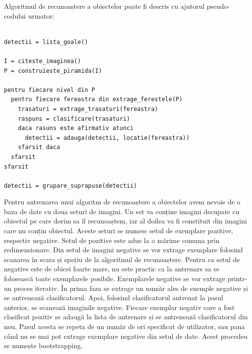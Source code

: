 Algoritmul de recunoaștere a obiectelor poate fi descris cu ajutorul pseudo-codului urmator:
\begin{mdframed}
\begin{verbatim}

detectii = lista_goale()

I = citeste_imaginea()
P = construieste_piramida(I)

pentru fiecare nivel din P
  pentru fiecare fereastra din extrage_ferestele(P)
    trasaturi = extrage_trasaturi(fereastra)
    raspuns = clasificare(trasaturi)
    daca rasuns este afirmativ atunci
      detectii = adauga(detectii, locatie(fereastra))
    sfarsit daca
  sfarsit
sfarsit

detectii = grupare_suprapuse(detectii)

\end{verbatim}
\end{mdframed}

Pentru antrenarea unui algoritm de recunoaștere a obiectelor avem nevoie de o baza de date cu doua seturi de imagini.
Un set va conține imagini decupate cu obiectul pe care dorim sa îl recunoaștem, iar al doilea va fi constituit din imagini care nu conțin obiectul.
Aceste seturi se numesc setul de exemplare pozitive, respectiv negative.
Setul de pozitive este adus la o mărime comuna prin redimensionare.
Din setul de imagini negative se vor extrage exemplare folosind scanarea în scara și spațiu de la algoritmul de recunoaștere.
Pentru ca setul de negative este de obicei foarte mare, nu este practic ca la antrenare sa se folosească toate exemplarele posibile.
Exemplarele negative se vor extrage printr-un proces iterativ.
În prima faza se extrage un număr ales de exemple negative și se antrenează clasificatorul.
Apoi, folosind clasificatorul antrenat la pasul anterior, se scanează imaginile negative.
Fiecare exemplar negativ care a fost clasificat pozitiv se adaugă la lista de antrenare și se antrenează clasificatorul din nou.
Pasul acesta se repeta de un număr de ori specificat de utilizator, sau pana când nu se mai pot extrage exemplare negative din setul de date.
Acest procedeu se numește bootstrapping.

